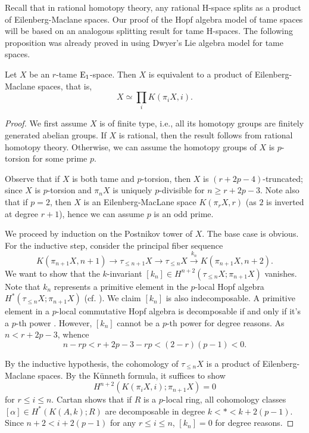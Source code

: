 Recall that in rational homotopy theory, any rational H-space splits as a product of Eilenberg-Maclane spaces.
Our proof of the Hopf algebra model of tame spaces will be based on an analogous splitting result for tame H-spaces. 
The following proposition was already proved in \cite[Proposition 1.7]{Scheerer-Tanre} using Dwyer's Lie algebra model for tame spaces. 
\begin{proposition}
\label{Decomp of tame H-spaces}
	Let $X$ be an $r$-tame $\operatorname{E}_1$-space. Then $X$ is equivalent to a product of Eilenberg-Maclane spaces, that is, 
	\[
	X \simeq \prod_i K(\pi_i X, i).
	\]
\end{proposition}
\pagebreak
\begin{proof}
We first assume $X$ is of finite type, i.e., all its homotopy groups are finitely generated abelian groups. If $X$ is rational, then the result follows from rational homotopy theory. Otherwise, we can assume the homotopy groups of $X$ is $p$-torsion for some prime $p$.

Observe that if $X$ is both tame and $p$-torsion, then $X$ is $(r+2p-4)$-truncated; since $X$ is $p$-torsion and $\pi_{n}X$ is uniquely $p$-divisible for $n \geq r+2p-3$. Note also that if $p=2$, then $X$ is an Eilenberg-MacLane space $K(\pi_r X, r)$ (as $2$ is inverted at degree $r+1$), hence we can assume $p$ is an odd prime. 

We proceed by induction on the Postnikov tower of $X$.
The base case is obvious. 	
For the inductive step, consider the principal fiber sequence
$$
K(\pi_{n+1}X,n+1)\to 
\tau_{\leq n+1}X
\to
\tau_{\leq n}X
\xrightarrow{k_n}
K(\pi_{n+1}X,n+2).
$$
We want to show that the $k$-invariant $[k_n]\in H^{n+2}(\tau_{\leq n}X; \pi_{n+1}X)$ vanishes. 
Note that $k_n$ represents a primitive element in the $p$-local Hopf algebra $H^*(\tau_{\leq n}X; \pi_{n+1}X)$ (cf. \cite[Theorem 3.2]{D.Kahn}).
We claim $[k_n]$ is also indecomposable.
A primitive element in a $p$-local commutative Hopf algebra is decomposable if and only if it's a $p$-th power \cite[Proposition 4.21]{Milnor-Moore}.
However, $[k_n]$ cannot be a $p$-th power for degree reasons. As
$n<r+2p-3$, whence
\[
n-rp<r+2p-3-rp< (2-r)(p-1)<0.
\]
	
By the inductive hypothesis, the cohomology of $\tau_{\leq n} X$ is a product of Eilenberg-Maclane spaces. By the K\"{u}nneth formula, 
it suffices to show 
$$
H^{n+2}(K(\pi_i X, i); \pi_{n+1}X) = 0
$$
for $r\leq i \leq n$.
Cartan \cite{Cartan_I} shows that if $R$ is a $p$-local ring, all cohomology classes  $[\alpha]\in H^{*}(K(A,k);R)$ are decomposable in degree $k<*<k+2(p-1)$. 
Since $n+2 < i + 2(p-1)$ for any $r\leq i \leq n$,
$[k_n]=0$ for degree reasons.


\end{proof}
